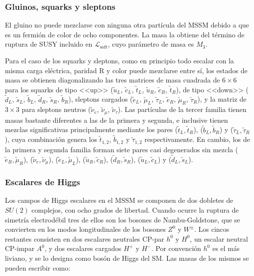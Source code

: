 \subsubsection{Gluinos, squarks y sleptons}

El gluino no puede mezclarse con ninguna otra partícula del MSSM debido a
que es un fermión de color de ocho componentes. La masa la obtiene del término de ruptura de SUSY incluido en $\mathcal{L}_{\text{soft}}$, cuyo parámetro de masa es $M_3$.

Para el caso de los squarks y sleptons, como en principio todo escalar con la misma carga eléctrica, paridad R y color puede mezclarse entre sí, los estados de masa se obtienen diagonalizando las tres matrices de masa cuadrada de $6\times6$ para los squarks de tipo <<up>> ($\tilde{u}_L$, $\tilde{c}_L$, $\tilde{t}_L$, $\tilde{u}_R$, $\tilde{c}_R$, $\tilde{t}_R$), de tipo <<down>> ($\tilde{d}_L$, $\tilde{s}_L$, $\tilde{b}_L$, $\tilde{d}_R$, $\tilde{s}_R$, $\tilde{b}_R$), sleptons cargados ($\tilde{e}_L$, $\tilde{\mu}_L$, $\tilde{\tau}_L$, $\tilde{e}_R$, $\tilde{\mu}_R$, $\tilde{\tau}_R$), y la matriz de $3\times3$ para sleptons neutros ($\tilde{\nu}_e$, $\tilde{\nu}_{\mu}$, $\tilde{\nu}_{\tau}$). Las partículas de la tercer familia tienen masas bastante diferentes a las de la primera y segunda, e inclusive tienen mezclas significativas principalmente mediante los pares ($\tilde{t}_L, \tilde{t}_R$), ($\tilde{b}_L, \tilde{b}_R$) y ($\tilde{\tau}_L, \tilde{\tau}_R$), cuya combinación genera los $\tilde{t}_{1,2}$, $\tilde{b}_{1,2}$ y $\tilde{\tau}_{1,2}$ respectivamente. En cambio, los de la primera y segunda familia forman siete pares casi degenerados sin mezcla ($\tilde{e}_R, \tilde{\mu}_R$), ($\tilde{\nu}_e, \tilde{\nu}_\mu$), ($\tilde{e}_L, \tilde{\mu}_L$), ($\tilde{u}_R, \tilde{c}_R$), ($\tilde{d}_R, \tilde{s}_R$), ($\tilde{u}_L, \tilde{c}_L$) y ($\tilde{d}_L, \tilde{s}_L$).





\subsubsection{Escalares de Higgs}

Los campos de Higgs escalares en el MSSM se componen de dos dobletes de $SU(2)$ complejos, con ocho grados de libertad. Cuando ocurre la ruptura de simetría electrodébil tres de ellos son los bosones de Nambu-Goldstone, que se convierten en los modos longitudinales de los bosones $Z^0$ y $W^{\pm}$. Los cincos restantes consisten en dos escalares neutrales CP-par $h^0$ y $H^0$, un escalar neutral CP-impar $A^0$, y dos escalares cargados $H^+$ y $H^-$. Por convención $h^0$ es el más liviano, y se lo designa como bosón de Higgs del SM. Las masas de los mismos se pueden escribir como:

